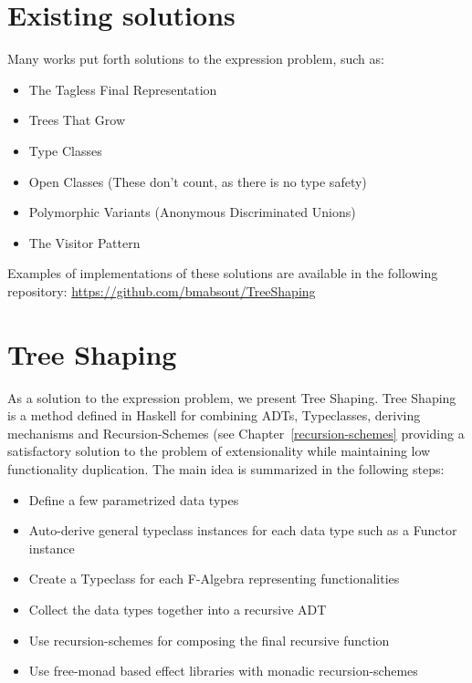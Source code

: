 \section{Existing solutions} \label{existing_solutions}
Many works put forth solutions to the expression problem, such as:
\begin{itemize}
    \item The Tagless Final Representation \cite{final_tagless}
    \item Trees That Grow \cite{najd2017trees}
    \item Type Classes
    \item Open Classes (These don't count, as there is no type safety)
    \item Polymorphic Variants (Anonymous Discriminated Unions)
    \item The Visitor Pattern \cite{expression_problem}
\end{itemize}

Examples of implementations of these solutions are available in the following repository: \url{https://github.com/bmabsout/TreeShaping}


\section{Tree Shaping} \label{tree_shaping}
As a solution to the expression problem, we present Tree Shaping. Tree Shaping is a method defined in Haskell for combining ADTs, Typeclasses, deriving mechanisms and Recursion-Schemes \cite{barbed_wires} (see Chapter~\ref{recursion-schemes} providing a satisfactory solution to the problem of extensionality while maintaining low functionality duplication. The main idea is summarized in the following steps:
\begin{itemize}
    \item Define a few parametrized data types
    \item Auto-derive general typeclass instances for each data type such as a Functor instance
    \item Create a Typeclass for each F-Algebra\cite{falgebra} representing functionalities
    \item Collect the data types together into a recursive ADT
    \item Use recursion-schemes for composing the final recursive function
    \item Use free-monad based effect libraries with monadic recursion-schemes
\end{itemize}

